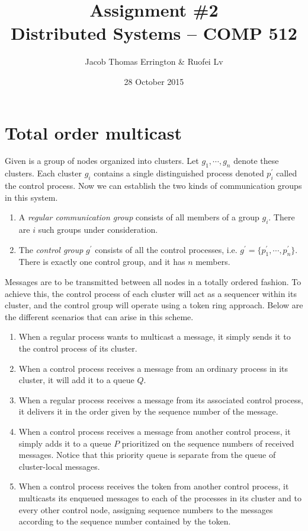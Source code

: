 \documentclass{article}
\author{Jacob Thomas Errington \& Ruofei Lv}
\title{Assignment \#2\\Distributed Systems -- COMP 512}
\date{28 October 2015}
\begin{document}
\maketitle

\section{Total order multicast}

Given is a group of nodes organized into clusters. Let $g_1, \cdots, g_n$
denote these clusters. Each cluster $g_i$ contains a single distinguished
process denoted $p^\prime_i$ called the control process. Now we can establish
the two kinds of communication groups in this system.

\begin{enumerate}
    \item A \emph{regular communication group} consists of all members of
        a group $g_i$. There are $i$ such groups under consideration.
    \item The \emph{control group} $g^\prime$ consists of all the control
        processes, i.e. $g^\prime = \{p^\prime_1, \cdots, p^\prime_n\}$. There
        is exactly one control group, and it has $n$ members.
\end{enumerate}

Messages are to be transmitted between all nodes in a totally ordered fashion.
To achieve this, the control process of each cluster will act as a sequencer
within its cluster, and the control group will operate using a token ring
approach. Below are the different scenarios that can arise in this scheme.

\begin{enumerate}
    \item When a regular process wants to multicast a message, it simply sends
        it to the control process of its cluster.

    \item When a control process receives a message from an ordinary process in
        its cluster, it will add it to a queue $Q$.

    \item When a regular process receives a message from its associated control
        process, it delivers it in the order given by the sequence number of
        the message.

    \item When a control process receives a message from another control
        process, it simply adds it to a queue $P$ prioritized on the sequence
        numbers of received messages. Notice that this priority queue is
        separate from the queue of cluster-local messages.

    \item When a control process receives the token from another control
        process, it multicasts its enqueued messages to each of the processes
        in its cluster and to every other control node, assigning sequence
        numbers to the messages according to the sequence number contained by
        the token.
\end{enumerate}
\end{document}
